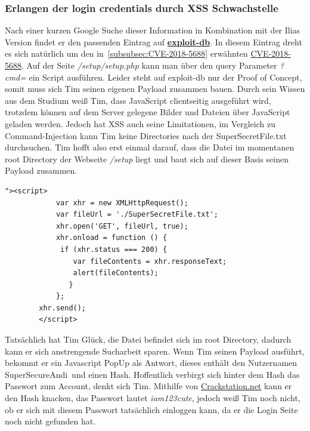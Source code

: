 \documentclass[10pt, a4paper,onecolumn ,titlepage]{article}
\begin{document}
    \subsubsection{Erlangen der login credentials durch XSS Schwachstelle}
    Nach einer kurzen Google Suche dieser Information in Kombination mit der Ilias Version findet er den passenden Eintrag auf \href{https://www.exploit-db.com/exploits/43595}{\textbf{exploit-db}}.
    In diesem Eintrag dreht es sich natürlich um den in~\ref{subsubsec:CVE-2018-5688} erwähnten \href{https://www.cve.org/CVERecord?id=CVE-2018-5688}{CVE-2018-5688}.
    Auf der Seite \textit{/setup/setup.php} kann man über den query Parameter \textit{?cmd=} ein Script ausführen. Leider steht auf exploit-db nur der Proof of Concept,
    somit muss sich Tim seinen eigenen Payload zusammen bauen. Durch sein Wissen aus dem Studium weiß Tim, dass JavaScript clientseitig ausgeführt wird, trotzdem können auf dem
    Server gelegene Bilder und Dateien über JavaScript geladen werden. Jedoch hat XSS auch seine Limitationen, im Vergleich zu Command-Injection kann Tim keine Directories nach der SuperSecretFile.txt durchsuchen.
    Tim hofft also erst einmal darauf, dass die Datei im momentanen root Directory der Webseite \textit{/setup} liegt und baut sich auf dieser Basis seinen Payload zusammen.

    \vspace{0.4cm}
    \begin{lstlisting}[label={lst:setupXSSpayload}]
        "><script>
            var xhr = new XMLHttpRequest();
            var fileUrl = './SuperSecretFile.txt';
            xhr.open('GET', fileUrl, true);
            xhr.onload = function () {
             if (xhr.status === 200) {
                var fileContents = xhr.responseText;
                alert(fileContents);
               }
            };
        xhr.send();
        </script>
    \end{lstlisting}
    \vspace{0.3cm}

    \noindent
    Tatsächlich hat Tim Glück, die Datei befindet sich im root Directory, dadurch kann er sich anstrengende Sucharbeit sparen. Wenn Tim seinen Payload ausführt,
    bekommt er ein Javascript PopUp als Antwort, dieses enthält den Nutzernamen \\ \glqq SuperSecureAndi\grqq\ und einen Hash. Hoffentlich verbirgt sich hinter dem Hash das Passwort
    zum Account, denkt sich Tim. Mithilfe von \href{https://crackstation.net/}{Crackstation.net} kann er den Hash knacken, das Passwort lautet \textit{iam123cute}, jedoch weiß Tim noch nicht, ob er sich mit
    diesem Passwort tatsächlich einloggen kann, da er die Login Seite noch nicht gefunden hat.
\end{document}

